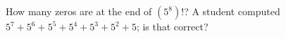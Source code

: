 How many zeros are at the end of $(5^8)!$? A student computed $5^7+5^6+5^5+5^4+5^3+5^2+5$; is that correct?
